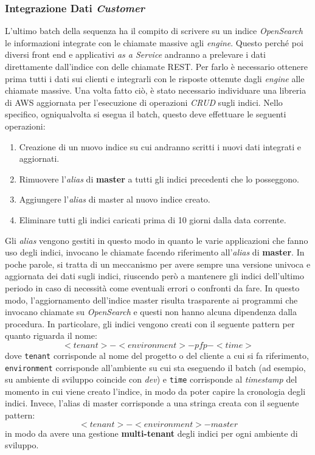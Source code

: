 \subsubsection{Integrazione Dati \textit{Customer}}\label{subsubsec:customer}
L'ultimo batch della sequenza ha il compito di scrivere su un indice \textit{OpenSearch} le informazioni integrate con le chiamate massive agli \textit{engine}.
Questo perché poi diversi front end e applicativi \textit{as a Service} andranno a prelevare i dati direttamente dall'indice con delle chiamate REST\@.
Per farlo è necessario ottenere prima tutti i dati sui clienti e integrarli con le risposte ottenute dagli \textit{engine} alle chiamate massive.
Una volta fatto ciò, è stato necessario individuare una libreria di AWS aggiornata per l'esecuzione di operazioni \textit{CRUD} sugli indici.
Nello specifico, ogniqualvolta si esegua il batch, questo deve effettuare le seguenti operazioni:
\begin{enumerate}
    \item Creazione di un nuovo indice su cui andranno scritti i nuovi dati integrati e aggiornati.
    \item Rimuovere l'\textit{alias} di \textbf{master} a tutti gli indici precedenti che lo posseggono.
    \item Aggiungere l'\textit{alias} di master al nuovo indice creato.
    \item Eliminare tutti gli indici caricati prima di 10 giorni dalla data corrente.
\end{enumerate}
Gli \textit{alias} vengono gestiti in questo modo in quanto le varie applicazioni che fanno uso degli indici, invocano le chiamate facendo riferimento all'\textit{alias} di \textbf{master}.
In poche parole, si tratta di un meccanismo per avere sempre una versione univoca e aggiornata dei dati sugli indici, riuscendo però a mantenere gli indici dell'ultimo periodo in caso di necessità come eventuali errori o confronti da fare.
In questo modo, l'aggiornamento dell'indice master risulta trasparente ai programmi che invocano chiamate su \textit{OpenSearch} e questi non hanno alcuna dipendenza dalla procedura.
In particolare, gli indici vengono creati con il seguente pattern per quanto riguarda il nome:
\[<tenant>-<environment>-pfp-<time>\]
dove \texttt{tenant} corrisponde al nome del progetto o del cliente a cui si fa riferimento, \texttt{environment} corrisponde all'ambiente su cui sta eseguendo il batch (ad esempio, su ambiente di sviluppo coincide con \textit{dev}) e \texttt{time} corrisponde al \textit{timestamp} del momento in cui viene creato l'indice, in modo da poter capire la cronologia degli indici.
Invece, l'alias di master corrisponde a una stringa creata con il seguente pattern:
\[<tenant>-<environment>-master\]
in modo da avere una gestione \textbf{multi-tenant} degli indici per ogni ambiente di sviluppo.

